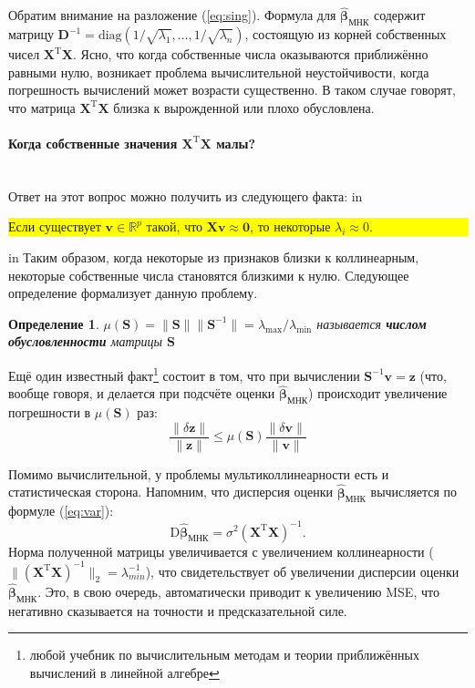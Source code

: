 \documentclass[12pt,a4paper,final]{article}
\newcommand{\betah}{\hat{\bm \beta}}
\newcommand{\D}{\mathrm{D}}
\newcommand{\XT}{{\bm{X}}^{\mathrm{T}}}
\newcommand{\X}{\bm{X}}
\newcommand{\1}{\mathds{1}}
\newtheorem{definition}{Определение}
\begin{document}
Обратим внимание на разложение (\ref{eq:sing}). Формула для $\betah_{\text{МНК}}$ содержит матрицу $\bm D^{-1} = \mathrm{diag} (1/\sqrt{\lambda_1}, \ldots, 1/\sqrt{\lambda_n})$, состоящую из корней собственных чисел $\XT \X$. Ясно, что когда собственные числа оказываются приближённо равными нулю, возникает проблема вычислительной неустойчивости, когда погрешность вычислений может возрасти существенно. В таком случае говорят, что матрица $\XT \X$ близка к вырожденной или плохо обусловлена.

\paragraph{Когда собственные значения $\XT \X$ малы?}
~\\Ответ на этот вопрос можно получить из следующего факта:
 in 
\noindent
\colorbox{yellow}{\parbox{\textwidth}{ Если существует $\bm v \in \mathbb R^p$ такой, что $\X \bm v \approx \bm 0$, то некоторые $\lambda_i \approx 0$. }}
 in 
\noindent Таким образом, когда некоторые из признаков близки к коллинеарным, некоторые собственные числа становятся близкими к нулю. Следующее определение формализует данную проблему.
\begin{definition}
$\mu(\bm S) = \|\bm S\|\|\bm S^{-1}\| = {\lambda_{\text{max}}}/{\lambda_{\text{min}}}$ называется \textbf{числом обусловленности} матрицы $\bm S$
\end{definition}

Ещё один известный факт\footnote{любой учебник по вычислительным методам и теории приближённых вычислений в линейной алгебре} состоит в том, что при вычислении $\bm S^{-1}\bm v = \bm z$ (что, вообще говоря, и делается при подсчёте оценки $\betah_{\text{МНК}}$) происходит увеличение погрешности в $\mu(\bm S)$ раз:
$$
\frac{\|\delta \bm z\|}{\|\bm z\|} \leqslant \mu(\bm S) \frac{\|\delta \bm v\|}{\|\bm v\|}
$$

Помимо вычислительной, у проблемы мультиколлинеарности есть и статистическая сторона. Напомним, что дисперсия оценки $\betah_{\text{МНК}}$ вычисляется по формуле (\ref{eq:var}):
$$
  \D {\betah_{\text{МНК}}} = \sigma^2 (\XT\X)^{-1}.
$$
Норма полученной матрицы увеличивается с увеличением коллинеарности ($\|(\XT\X)^{-1}\|_2 = \lambda_{min}^{-1}$), что свидетельствует об увеличении дисперсии оценки $\betah_{\text{МНК}}$. Это, в свою очередь, автоматически приводит к увеличению MSE, что негативно сказывается на точности и предсказательной силе.
\end{document}

